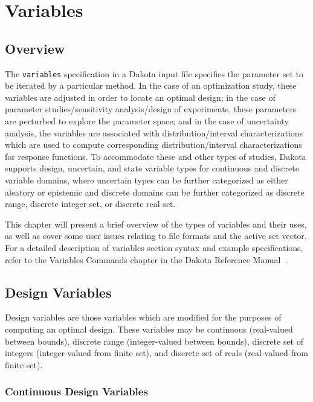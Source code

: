 \chapter{Variables}\label{variables}

\section{Overview}\label{variables:overview}

The \texttt{variables} specification in a Dakota input file specifies
the parameter set to be iterated by a particular method. In the case
of an optimization study, these variables are adjusted in order to
locate an optimal design; in the case of parameter studies/sensitivity
analysis/design of experiments, these parameters are perturbed to
explore the parameter space; and in the case of uncertainty analysis,
the variables are associated with distribution/interval
characterizations which are used to compute corresponding
distribution/interval characterizations for response functions. To
accommodate these and other types of studies, Dakota supports design,
uncertain, and state variable types for continuous and discrete
variable domains, where uncertain types can be further categorized as
either aleatory or epistemic and discrete domains can be further
categorized as discrete range, discrete integer set, or discrete real
set.

This chapter will present a brief overview of the types of variables
and their uses, as well as cover some user issues relating to file
formats and the active set vector.  For a detailed description of
variables section syntax and example specifications, refer to the
Variables Commands chapter in the Dakota Reference Manual~\cite{RefMan}.


\section{Design Variables}\label{variables:design}


Design variables are those variables which are modified for the
purposes of computing an optimal design. These variables may be
continuous (real-valued between bounds), discrete range
(integer-valued between bounds), discrete set of integers
(integer-valued from finite set), and discrete set of reals
(real-valued from finite set).

\subsection{Continuous Design Variables}\label{variables:design:cdv}

